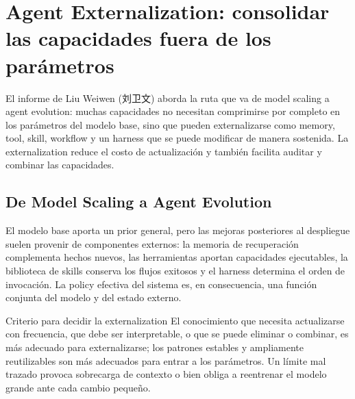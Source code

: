 \section{Agent Externalization: consolidar las capacidades fuera de los parámetros}

El informe de Liu Weiwen (刘卫文) aborda la ruta que va de model scaling a agent evolution: muchas capacidades no necesitan comprimirse por completo en los parámetros del modelo base, sino que pueden externalizarse como memory, tool, skill, workflow y un harness que se puede modificar de manera sostenida. La externalization reduce el costo de actualización y también facilita auditar y combinar las capacidades.



\subsection{De Model Scaling a Agent Evolution}

El modelo base aporta un prior general, pero las mejoras posteriores al despliegue suelen provenir de componentes externos: la memoria de recuperación complementa hechos nuevos, las herramientas aportan capacidades ejecutables, la biblioteca de skills conserva los flujos exitosos y el harness determina el orden de invocación. La policy efectiva del sistema es, en consecuencia, una función conjunta del modelo y del estado externo.



\begin{importantbox}{Criterio para decidir la externalization}
El conocimiento que necesita actualizarse con frecuencia, que debe ser interpretable, o que se puede eliminar o combinar, es más adecuado para externalizarse; los patrones estables y ampliamente reutilizables son más adecuados para entrar a los parámetros. Un límite mal trazado provoca sobrecarga de contexto o bien obliga a reentrenar el modelo grande ante cada cambio pequeño.
\end{importantbox}

